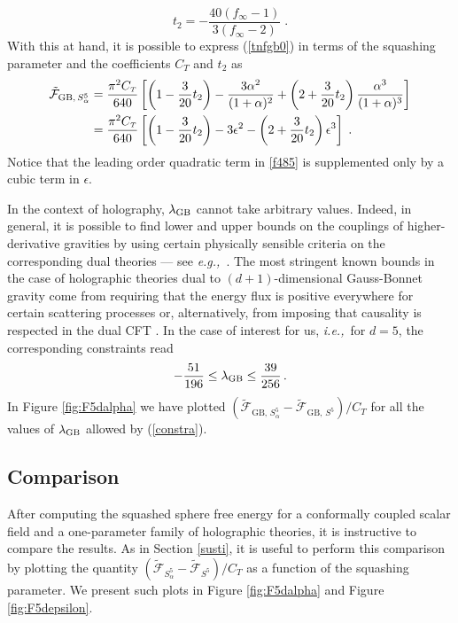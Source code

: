 \documentclass[12pt]{article}
\numberwithin{equation}{section}
\newcommand{\req}[1]{(\ref{#1})} %
\newcommand{\ssc}{\scriptscriptstyle}
\newcommand{\eg}{{\it e.g.,}\ }
\newcommand{\ie}{{\it i.e.,}\ }
\newcommand{\ctt}{C_{\ssc T}}
\begin{document}
%
\begin{equation}\label{t2GBdef}
t_2=-\frac{40(f_{\infty}-1)}{3(f_{\infty}-2)}\;.
\end{equation}
%
With this at hand, it is possible to express \req{tnfgb0} in terms of the squashing parameter and the coefficients $\ctt$ and $t_2$ as
%
\begin{align}\label{tnfgb}
\tilde{\mathcal{F}}_{\textrm{GB},\, S^{5}_{\alpha}}&= \frac{  \pi ^2 \ctt}{640}\left[\left(1-\frac{3}{20}t_2\right)-  \frac{3\alpha^2}{(1+\alpha)^2}+\left(2+\frac{3}{20}t_2\right) \frac{\alpha^3}{(1+\alpha)^3}\right] \\ \notag &=\frac{  \pi ^2 \ctt}{640}\left[\left(1-\frac{3}{20}t_2\right)- 3\epsilon^2 -\left(2+\frac{3}{20}t_2\right) \epsilon^3\right]\;.
\end{align}
%
Notice that the leading order quadratic term in \eqref{f485} is supplemented only by a cubic term in $\epsilon$. 

In the context of holography, $\lambda_{\rm GB}$ cannot take arbitrary values. Indeed, in general, it is possible to find lower and upper bounds on the couplings of higher-derivative gravities by using certain physically sensible criteria on the corresponding dual theories --- see \eg \cite{Hofman:2008ar,Buchel:2009sk,Buchel:2009tt,deBoer:2009pn,Ge:2009eh,Camanho:2009vw,Banerjee:2014oaa,Brigante:2008gz}. The most stringent known bounds in the case of holographic theories dual to $(d+1)$-dimensional Gauss-Bonnet gravity come from requiring that the energy flux is positive everywhere for certain scattering processes or, alternatively, from imposing that causality is respected in the dual CFT \cite{Buchel:2009sk}. In the case of interest for us, \ie for $d=5$, the corresponding constraints read
%
\begin{equation}\label{constra}
 -\frac{51}{196}\leq \lambda_{\rm GB} \leq \frac{39}{256}\, .
\end{equation}
%
In Figure \ref{fig:F5dalpha} we have plotted $(\tilde{\mathcal{F}}_{\textrm{GB},\, S^5_\alpha}- \tilde{\mathcal{F}}_{\textrm{GB},\, S^5})/\ctt $ for all the values of $\lambda_{\rm GB}$ allowed by \req{constra}. 


\subsection{Comparison}
\label{compa5}

After computing the squashed sphere free energy for a conformally coupled scalar field and a one-parameter family of holographic theories, it is instructive to compare the results. As in Section \ref{susti}, it is useful to perform this comparison by plotting the quantity $(\tilde{\mathcal{F}}_{S^5_{\alpha}}-\tilde{\mathcal{F}}_{S^5})/\ctt$ as a function of the squashing parameter. We present such plots in Figure \ref{fig:F5dalpha} and Figure \ref{fig:F5depsilon}.
\end{document}
